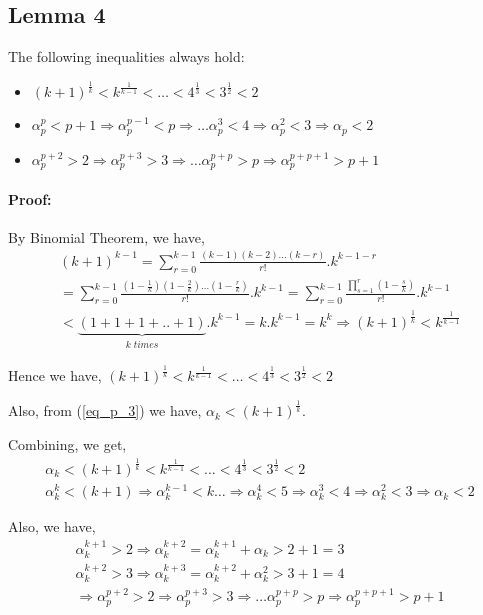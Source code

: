 \documentclass{ijcsa}
\begin{document}
\subsection{Lemma 4}
\label{sec:Lemma4}
\par The following inequalities always hold:
\begin{itemize}
\item $(k+1)^{\frac{1}{k}}<k^{\frac{1}{k-1}}<\ldots<4^{\frac{1}{3}}<3^{\frac{1}{2}}<2$
\item $\alpha_p^{p}<p+1\Rightarrow\alpha_p^{p-1}<p\Rightarrow\ldots\alpha_p^{3}<4\Rightarrow\alpha_p^{2}<3\Rightarrow\alpha_p<2$
\item $\alpha_p^{p+2}>2\Rightarrow\alpha_p^{p+3}>3\Rightarrow\ldots\alpha_p^{p+p}>p\Rightarrow\alpha_p^{p+p+1}>p+1$
\end{itemize}
\paragraph{Proof:}
\label{sec:Proof_4}
\par By Binomial Theorem, we have, 
\begin{eqnarray}
	\label{eq_bin}
(k+1)^{k-1}=\sum_{r=0}^{k-1}{\frac{\left(k-1\right)\left(k-2\right)\ldots\left(k-r\right)}{r!}.k^{k-1-r}} \nonumber \\
=\sum_{r=0}^{k-1}{\frac{\left(1-\frac{1}{k}\right)\left(1-\frac{2}{k}\right)\ldots\left(1-\frac{r}{k}\right)}{r!}.k^{k-1}}  
=\sum_{r=0}^{k-1}{\frac{\prod_{s=1}^{r}{\left(1-\frac{s}{k}\right)}}{r!}.k^{k-1}} \nonumber \\
<\underbrace{(1+1+1+..+1)}_{k\;times}.k^{k-1}=k.k^{k-1}=k^k 
\Rightarrow (k+1)^{\frac{1}{k}}<k^{\frac{1}{k-1}}
\end{eqnarray}  	
\par Hence we have, $(k+1)^{\frac{1}{k}}<k^{\frac{1}{k-1}}<\ldots<4^{\frac{1}{3}}<3^{\frac{1}{2}}<2$
\par Also, from (\ref{eq_p_3}) we have, $\alpha_{k}<(k+1)^{\frac{1}{k}}$. 
\par Combining, we get, 
\begin{eqnarray}
\alpha_{k}<(k+1)^{\frac{1}{k}}<k^{\frac{1}{k-1}}<\ldots<4^{\frac{1}{3}}<3^{\frac{1}{2}}<2 \nonumber \\
\alpha_{k}^{k}<(k+1)\Rightarrow\alpha_{k}^{k-1}<k\ldots \Rightarrow \alpha_{k}^{4}<5 \Rightarrow \alpha_{k}^{3}<4 \Rightarrow \alpha_{k}^{2}<3 \Rightarrow \alpha_{k}<2  
\end{eqnarray}

Also, we have,
\begin{eqnarray}
\alpha_{k}^{k+1}>2\Rightarrow\alpha_{k}^{k+2}=\alpha_{k}^{k+1}+\alpha_{k}>2+1=3 \nonumber \\
\alpha_{k}^{k+2}>3\Rightarrow\alpha_{k}^{k+3}=\alpha_{k}^{k+2}+\alpha_{k}^{2}>3+1=4 \nonumber \\
\Rightarrow \alpha_p^{p+2}>2\Rightarrow\alpha_p^{p+3}>3\Rightarrow\ldots\alpha_p^{p+p}>p\Rightarrow\alpha_p^{p+p+1}>p+1
\end{eqnarray}
\end{document}
